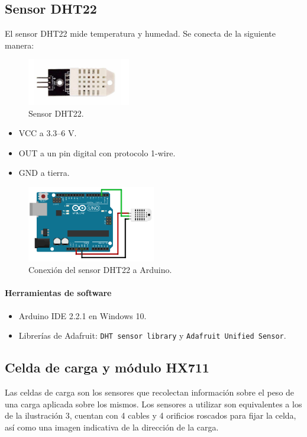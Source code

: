 \subsection{Sensor DHT22}

El sensor DHT22 mide temperatura y humedad. Se conecta de la siguiente manera:
\begin{figure}[!ht]
    \centering
    \includegraphics[width=0.4\textwidth]{assets/metodos_herramientas/dht22.png}
    \caption{Sensor DHT22.}
    \label{fig:dht22}
\end{figure}
\begin{itemize}
    \item VCC a 3.3--6 V.
    \item OUT a un pin digital con protocolo 1-wire.
    \item GND a tierra.
\end{itemize}

\begin{figure}[!ht]
    \centering
    \includegraphics[width=0.5\textwidth]{assets/metodos_herramientas/arduino_dht22.png}
    \caption{Conexión del sensor DHT22 a Arduino.}
    \label{fig:arduino_dht22}
\end{figure}

\paragraph{Herramientas de software}
\begin{itemize}
    \item Arduino IDE 2.2.1 en Windows 10.
    \item Librerías de Adafruit: \texttt{DHT sensor library} y \texttt{Adafruit Unified Sensor}.
\end{itemize}

\subsection{Celda de carga y módulo HX711}
Las celdas de carga son los sensores que recolectan información sobre el peso de una carga aplicada sobre los mismos. Los sensores a utilizar son equivalentes a los de la ilustración 3, cuentan con 4 cables y 4 orificios roscados para fijar la celda, así como una imagen indicativa de la dirección de la carga.

